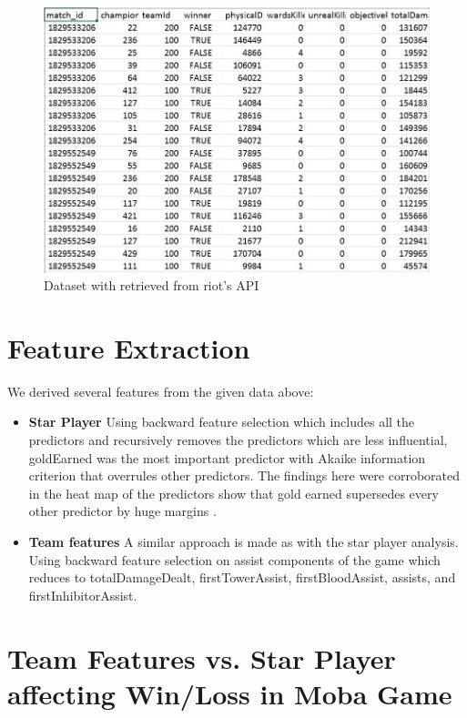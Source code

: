 \documentclass[conference]{IEEEtran}
\begin{document}
\begin{figure}[!t]
\includegraphics[width=\linewidth]{tab6}
\caption{Dataset with retrieved from riot's API}
\label{fig_sim}
\end{figure}


\section{Feature Extraction}
We derived several features from the given data above: 
\begin{itemize}
  \item \textbf{Star Player}  Using backward feature selection which includes all the predictors and recursively removes the predictors which are less influential, goldEarned was the most important predictor with Akaike information criterion that overrules other predictors. The findings here were corroborated in the heat map of the predictors show that gold earned supersedes every other predictor by huge margins \cite{Patterson}. 
  \item \textbf{Team features}  A similar approach is made as with the star player analysis. Using backward feature selection on assist components of the game which reduces to totalDamageDealt, firstTowerAssist, firstBloodAssist, assists, and firstInhibitorAssist. 
\end{itemize}

\section{Team Features vs. Star Player affecting Win/Loss in Moba Game}
\end{document}
